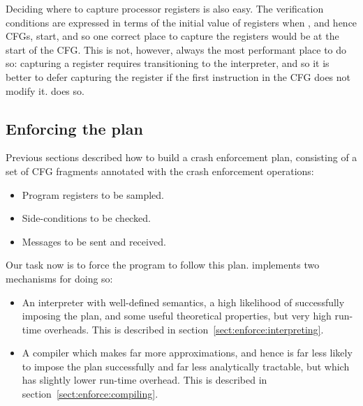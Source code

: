 Deciding where to capture processor registers is also easy.  The
verification conditions are expressed in terms of the initial value of
registers when {\StateMachines}, and hence CFGs, start, and so one
correct place to capture the registers would be at the start of the
CFG.  This is not, however, always the most performant place to do so:
capturing a register requires transitioning to the interpreter, and so
it is better to defer capturing the register if the first instruction
in the CFG does not modify it.  {\Implementation} does so.


\subsection{Enforcing the plan}


Previous sections described how to build a crash enforcement plan,
consisting of a set of CFG fragments annotated with the crash
enforcement operations:

\begin{itemize}
\item Program registers to be sampled.
\item Side-conditions to be checked.
\item Messages to be sent and received.
\end{itemize}

Our task now is to force the program to follow this plan.
{\Implementation} implements two mechanisms for doing so:

\begin{itemize}
\item
  An interpreter with well-defined semantics, a high likelihood of
  successfully imposing the plan, and some useful theoretical
  properties, but very high run-time overheads.  This is described in
  section~\ref{sect:enforce:interpreting}.
\item
  A compiler which makes far more approximations, and hence is far
  less likely to impose the plan successfully and far less
  analytically tractable, but which has slightly lower run-time
  overhead.  This is described in section~\ref{sect:enforce:compiling}.
\end{itemize}

